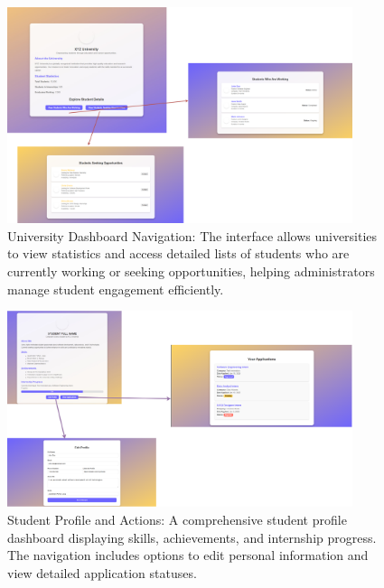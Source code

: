 \begin{figure}[!h]
\centering
\includegraphics[width=0.9\textwidth, angle=0]{Images/Main3.png}
\caption{\label{fig:metamodel}University Dashboard Navigation: The interface allows universities to view statistics and access detailed lists of students who are currently working or seeking opportunities, helping administrators manage student engagement efficiently.}
\end{figure}

\begin{figure}[!h]
\centering
\includegraphics[width=0.9\textwidth, angle=0]{Images/Main4.png}
\caption{\label{fig:metamodel}Student Profile and Actions: A comprehensive student profile dashboard displaying skills, achievements, and internship progress. The navigation includes options to edit personal information and view detailed application statuses.}
\end{figure}

